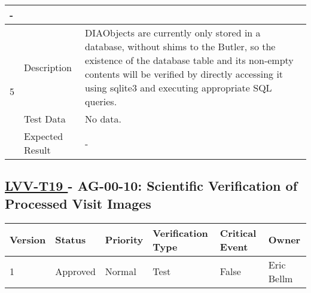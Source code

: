 \begin{longtable}[]{p{1.3cm}p{2cm}p{13cm}}
\begin{minipage}[t]{13cm}{\footnotesize
-
\vspace{\dp0}
} \end{minipage} 


\\ \midrule



\multirow{3}{*}{ 5 } & Description &
\begin{minipage}[t]{13cm}{\footnotesize
DIAObjects are currently only stored in a database, without shims to the
Butler, so the existence of the database table and its non-empty
contents will be verified by directly accessing it using sqlite3 and
executing appropriate SQL queries.
 
\vspace{\dp0}
} \end{minipage} \\ \cline{2-3}
& Test Data & 
\begin{minipage}[t]{13cm}{\footnotesize

No data. 
\vspace{\dp0}

} \end{minipage} \\ \cline{2-3}
& Expected Result &

\begin{minipage}[t]{13cm}{\footnotesize
-
\vspace{\dp0}
} \end{minipage} 


\\ \midrule

\end{longtable}




\subsection{ \href{https://jira.lsstcorp.org/secure/Tests.jspa\#/testCase/LVV-T19}{ LVV-T19 }
             - AG-00-10: Scientific Verification of Processed Visit Images }\label{lvv-t19}





\begin{longtable}[]{llllll}
\toprule
Version & Status & Priority & Verification Type & Critical Event & Owner
\\\midrule
1 & Approved & Normal & Test & False & Eric Bellm
\\\bottomrule
\end{longtable}

